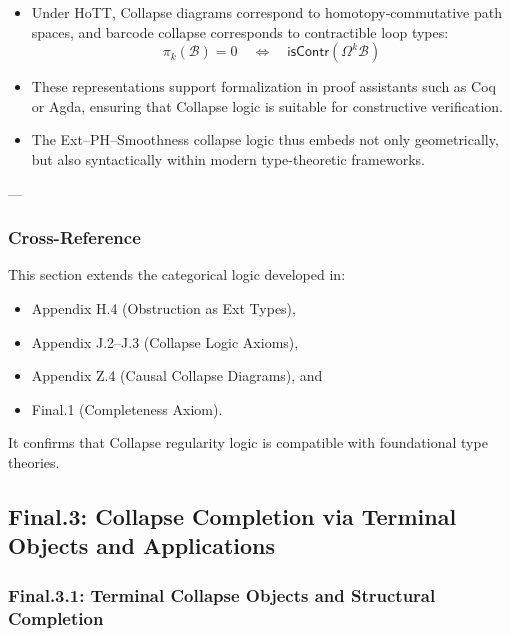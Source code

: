 \documentclass[11pt]{article}
\begin{document}
\begin{axiom}
\begin{axiom}
{{\begin{itemize}
  \item Under HoTT, Collapse diagrams correspond to homotopy-commutative path spaces,  
  and barcode collapse corresponds to contractible loop types:  
  \[
  \pi_k(\mathcal{B}) = 0 \quad \Leftrightarrow \quad \mathsf{isContr}(\Omega^k \mathcal{B})
  \]

  \item These representations support formalization in proof assistants such as Coq or Agda,  
  ensuring that Collapse logic is suitable for constructive verification.

  \item The Ext--PH--Smoothness collapse logic thus embeds not only geometrically,  
  but also syntactically within modern type-theoretic frameworks.
\end{itemize}

---

\subsubsection*{Cross-Reference}

This section extends the categorical logic developed in:
\begin{itemize}
  \item Appendix H.4 (Obstruction as Ext Types),
  \item Appendix J.2--J.3 (Collapse Logic Axioms),
  \item Appendix Z.4 (Causal Collapse Diagrams), and
  \item Final.1 (Completeness Axiom).
\end{itemize}

It confirms that Collapse regularity logic is compatible with foundational type theories.





\subsection*{Final.3: Collapse Completion via Terminal Objects and Applications}

\subsubsection*{Final.3.1: Terminal Collapse Objects and Structural Completion}

}}
\end{axiom}
\end{axiom}
\end{document}
